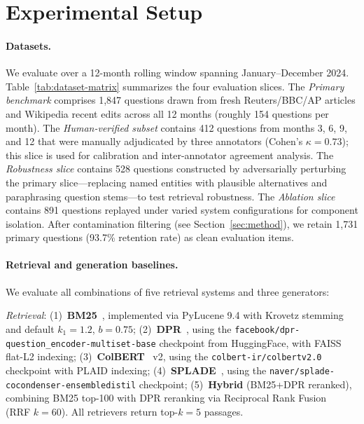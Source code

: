 \section{Experimental Setup}
\label{sec:setup}

\paragraph{Datasets.}
We evaluate over a 12-month rolling window spanning January--December 2024. Table~\ref{tab:dataset-matrix} summarizes the four evaluation slices. The \emph{Primary benchmark} comprises 1,847 questions drawn from fresh Reuters/BBC/AP articles and Wikipedia recent edits across all 12 months (roughly 154 questions per month). The \emph{Human-verified subset} contains 412 questions from months 3, 6, 9, and 12 that were manually adjudicated by three annotators (Cohen's $\kappa = 0.73$); this slice is used for calibration and inter-annotator agreement analysis. The \emph{Robustness slice} contains 528 questions constructed by adversarially perturbing the primary slice---replacing named entities with plausible alternatives and paraphrasing question stems---to test retrieval robustness. The \emph{Ablation slice} contains 891 questions replayed under varied system configurations for component isolation. After contamination filtering (see Section~\ref{sec:method}), we retain 1,731 primary questions (93.7\% retention rate) as clean evaluation items.

\paragraph{Retrieval and generation baselines.}
We evaluate all combinations of five retrieval systems and three generators:

\noindent\textit{Retrieval}: (1)~\textbf{BM25}~\citep{robertson2009bm25}, implemented via PyLucene 9.4 with Krovetz stemming and default $k_1{=}1.2$, $b{=}0.75$; (2)~\textbf{DPR}~\citep{karpukhin2020dpr}, using the \mbox{\texttt{facebook/dpr-question\_encoder-multiset-base}} checkpoint from HuggingFace, with FAISS~\citep{johnson2021faiss} flat-L2 indexing; (3)~\textbf{ColBERT}~\citep{khattab2020colbert} v2, using the \mbox{\texttt{colbert-ir/colbertv2.0}} checkpoint with PLAID indexing; (4)~\textbf{SPLADE}~\citep{formal2021splade}, using the \mbox{\texttt{naver/splade-cocondenser-ensembledistil}} checkpoint; (5)~\textbf{Hybrid} (BM25+DPR reranked), combining BM25 top-100 with DPR reranking via Reciprocal Rank Fusion~\citep{cormack2009rrf} (RRF $k=60$). All retrievers return top-$k=5$ passages.


